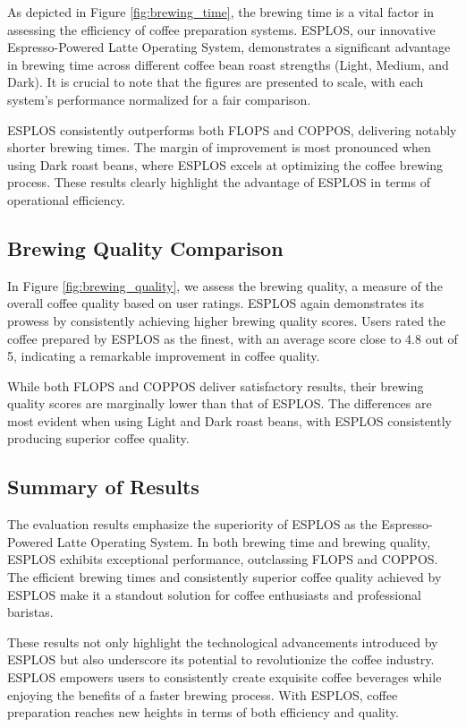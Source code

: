 \documentclass[nonacm,sigplan]{acmart}
\begin{document}
As depicted in Figure \ref{fig:brewing_time}, the brewing time is a vital factor in assessing the efficiency of coffee preparation systems. ESPLOS, our innovative Espresso-Powered Latte Operating System, demonstrates a significant advantage in brewing time across different coffee bean roast strengths (Light, Medium, and Dark). It is crucial to note that the figures are presented to scale, with each system's performance normalized for a fair comparison.

ESPLOS consistently outperforms both FLOPS and COPPOS, delivering notably shorter brewing times. The margin of improvement is most pronounced when using Dark roast beans, where ESPLOS excels at optimizing the coffee brewing process. These results clearly highlight the advantage of ESPLOS in terms of operational efficiency.

\subsection{Brewing Quality Comparison}

In Figure \ref{fig:brewing_quality}, we assess the brewing quality, a measure of the overall coffee quality based on user ratings. ESPLOS again demonstrates its prowess by consistently achieving higher brewing quality scores. Users rated the coffee prepared by ESPLOS as the finest, with an average score close to 4.8 out of 5, indicating a remarkable improvement in coffee quality.

While both FLOPS and COPPOS deliver satisfactory results, their brewing quality scores are marginally lower than that of ESPLOS. The differences are most evident when using Light and Dark roast beans, with ESPLOS consistently producing superior coffee quality.

\subsection{Summary of Results}

The evaluation results emphasize the superiority of ESPLOS as the Espresso-Powered Latte Operating System. In both brewing time and brewing quality, ESPLOS exhibits exceptional performance, outclassing FLOPS and COPPOS. The efficient brewing times and consistently superior coffee quality achieved by ESPLOS make it a standout solution for coffee enthusiasts and professional baristas.

These results not only highlight the technological advancements introduced by ESPLOS but also underscore its potential to revolutionize the coffee industry. ESPLOS empowers users to consistently create exquisite coffee beverages while enjoying the benefits of a faster brewing process. With ESPLOS, coffee preparation reaches new heights in terms of both efficiency and quality.
\end{document}
